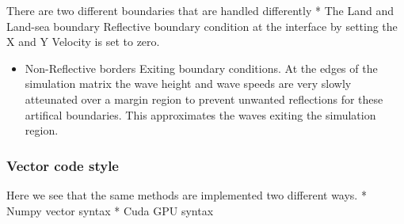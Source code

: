 \documentclass[11pt]{article}
\providecommand{\tightlist}{%
      \setlength{\itemsep}{0pt}\setlength{\parskip}{0pt}}
\begin{document}
There are two different boundaries that are handled differently * The
Land and Land-sea boundary Reflective boundary condition at the
interface by setting the X and Y Velocity is set to zero.

\begin{itemize}
\tightlist
\item
   Non-Reflective borders Exiting boundary conditions. At the edges of
  the simulation matrix the wave height and wave speeds are very slowly
  atteunated over a margin region to prevent unwanted reflections for
  these artifical boundaries. This approximates the waves exiting the
  simulation region.
\end{itemize}

\hypertarget{vector-code-style}{%
\subsubsection{Vector code style}\label{vector-code-style}}

Here we see that the same methods are implemented two different ways. *
Numpy vector syntax * Cuda GPU syntax
\end{document}
